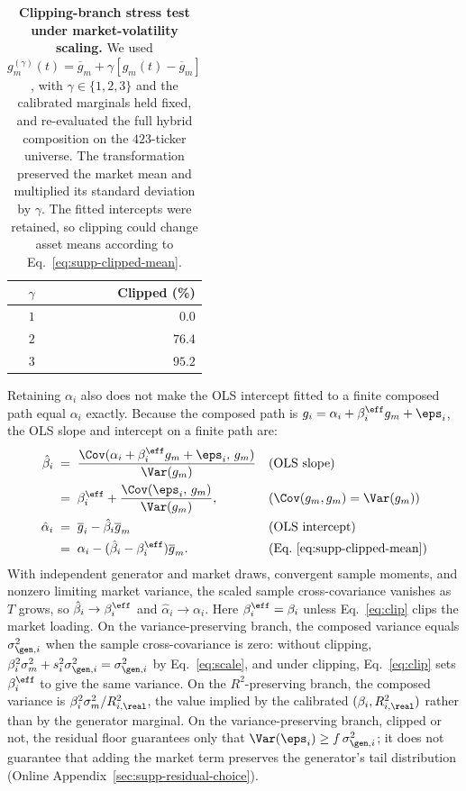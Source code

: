 \begin{table}[H]
\centering
\caption{\textbf{Clipping-branch stress test under market-volatility
    scaling.} We used
    $g_m^{(\gamma)}(t)=\overline{g}_m+
    \gamma[g_m(t)-\overline{g}_m]$, with
    $\gamma\in\{1,2,3\}$ and the calibrated marginals held fixed,
    and re-evaluated the full hybrid composition on the $423$-ticker
    universe. The transformation preserved the market mean and
    multiplied its standard deviation by $\gamma$. The fitted
    intercepts were retained, so clipping could change asset means
    according to Eq.~\eqref{eq:supp-clipped-mean}.}
\label{tab:stress}
\small
\begin{tabular}{@{}rr@{}}
\toprule
\textbf{$\gamma$} & \textbf{Clipped (\%)} \\ \midrule
$1$ & $0.0$  \\
$2$ & $76.4$ \\
$3$ & $95.2$ \\
\bottomrule
\end{tabular}
\end{table}

Retaining $\alpha_i$ also does not make the OLS intercept fitted to a
finite composed path equal $\alpha_i$ exactly. Because the composed
path is $g_i = \alpha_i + \beta_i^{\eff} g_m + \eps_i$, the OLS slope
and intercept on a finite path are:
\begin{align}
  \hat\beta_i
    &\;=\; \frac{\Cov(\alpha_i + \beta_i^{\eff} g_m + \eps_i,\, g_m)}{\Var(g_m)}
    && \text{(OLS slope)} \notag \\
    &\;=\; \beta_i^{\eff} + \frac{\Cov(\eps_i,\, g_m)}{\Var(g_m)},
    && \text{($\Cov(g_m, g_m) = \Var(g_m)$)} \notag \\
  \hat\alpha_i
    &\;=\; \overline{g}_i-\hat\beta_i\overline{g}_m
    && \text{(OLS intercept)} \notag \\
    &\;=\; \alpha_i-(\hat\beta_i-\beta_i^{\eff})\overline{g}_m.
    && \text{(Eq.~\eqref{eq:supp-clipped-mean})}
\end{align}
With independent generator and market draws, convergent sample
moments, and nonzero limiting market variance, the scaled sample
cross-covariance vanishes as $T$ grows, so $\hat\beta_i \to \beta_i^{\eff}$ and
$\hat\alpha_i \to \alpha_i$. Here $\beta_i^{\eff}=\beta_i$ unless
Eq.~\eqref{eq:clip} clips the market loading. On the
variance-preserving branch, the composed variance equals
$\sigma_{\gen,i}^2$ when the sample cross-covariance is zero: without
clipping, $\beta_i^2 \sigma_m^2 + s_i^2 \sigma_{\gen,i}^2 =
\sigma_{\gen,i}^2$ by Eq.~\eqref{eq:scale}, and under clipping,
Eq.~\eqref{eq:clip} sets $\beta_i^{\eff}$ to give the same variance.
On the $R^2$-preserving branch, the composed variance is
$\beta_i^2 \sigma_m^2 / R^2_{i,\real}$, the value implied by the
calibrated $(\beta_i, R^2_{i,\real})$ rather than by the generator
marginal. On the variance-preserving branch, clipped or not, the
residual floor guarantees only that $\Var(\eps_i)\geq
f\,\sigma_{\gen,i}^2$; it does not guarantee that adding the market
term preserves the generator's tail distribution (Online
Appendix~\ref{sec:supp-residual-choice}).

